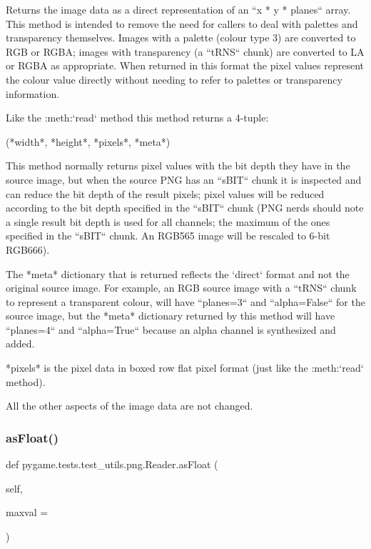 \begin{DoxyVerb}Returns the image data as a direct representation of an
``x * y * planes`` array.  This method is intended to remove the
need for callers to deal with palettes and transparency
themselves.  Images with a palette (colour type 3)
are converted to RGB or RGBA; images with transparency (a
``tRNS`` chunk) are converted to LA or RGBA as appropriate.
When returned in this format the pixel values represent the
colour value directly without needing to refer to palettes or
transparency information.

Like the :meth:`read` method this method returns a 4-tuple:

(*width*, *height*, *pixels*, *meta*)

This method normally returns pixel values with the bit depth
they have in the source image, but when the source PNG has an
``sBIT`` chunk it is inspected and can reduce the bit depth of
the result pixels; pixel values will be reduced according to
the bit depth specified in the ``sBIT`` chunk (PNG nerds should
note a single result bit depth is used for all channels; the
maximum of the ones specified in the ``sBIT`` chunk.  An RGB565
image will be rescaled to 6-bit RGB666).

The *meta* dictionary that is returned reflects the `direct`
format and not the original source image.  For example, an RGB
source image with a ``tRNS`` chunk to represent a transparent
colour, will have ``planes=3`` and ``alpha=False`` for the
source image, but the *meta* dictionary returned by this method
will have ``planes=4`` and ``alpha=True`` because an alpha
channel is synthesized and added.

*pixels* is the pixel data in boxed row flat pixel format (just
like the :meth:`read` method).

All the other aspects of the image data are not changed.
\end{DoxyVerb}
 \mbox{\label{classpygame_1_1tests_1_1test__utils_1_1png_1_1_reader_a8c5cd10b9761109a43f405bb134f580d}} 
\subsubsection{\texorpdfstring{as\+Float()}{asFloat()}}
{\footnotesize\ttfamily def pygame.\+tests.\+test\+\_\+utils.\+png.\+Reader.\+as\+Float (\begin{DoxyParamCaption}\item[{}]{self,  }\item[{}]{maxval = {} }\end{DoxyParamCaption})}

